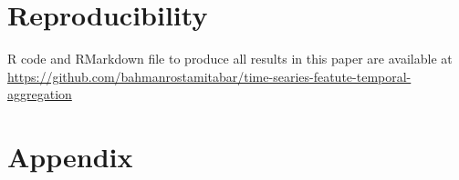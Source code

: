 \documentclass[preprint, 3p,
authoryear]{elsarticle} %
\begin{document}
\hypertarget{reproducibility}{%
\section*{Reproducibility}\label{reproducibility}}

R code and RMarkdown file to produce all results in this paper are
available at
\url{https://github.com/bahmanrostamitabar/time-searies-featute-temporal-aggregation}

\hypertarget{appendix}{%
\section*{Appendix}\label{appendix}}

\begin{landscape}\begin{table}[!h]


\end{table}
\end{landscape}
\end{document}
